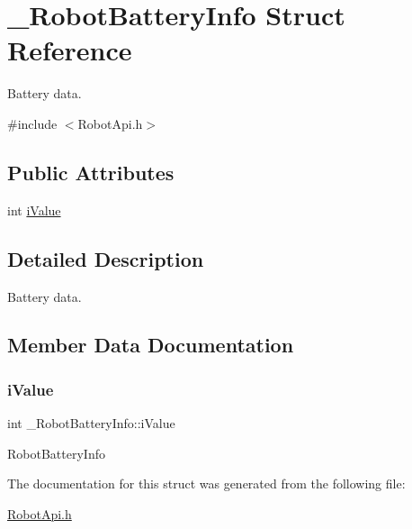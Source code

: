 \hypertarget{struct__RobotBatteryInfo}{}\section{\+\_\+\+Robot\+Battery\+Info Struct Reference}
\label{struct__RobotBatteryInfo}


Battery data.  




{\ttfamily \#include $<$Robot\+Api.\+h$>$}

\subsection*{Public Attributes}
\begin{DoxyCompactItemize}
\item 
int \hyperlink{struct__RobotBatteryInfo_a7b54314dbf8b141f72d38bcdf1ae3bca}{i\+Value}
\end{DoxyCompactItemize}


\subsection{Detailed Description}
Battery data. 

\subsection{Member Data Documentation}
\mbox{\label{struct__RobotBatteryInfo_a7b54314dbf8b141f72d38bcdf1ae3bca}} 
\subsubsection{\texorpdfstring{i\+Value}{iValue}}
{\footnotesize\ttfamily int \+\_\+\+Robot\+Battery\+Info\+::i\+Value}

Robot\+Battery\+Info 

The documentation for this struct was generated from the following file\+:\begin{DoxyCompactItemize}
\item 
\hyperlink{RobotApi_8h}{Robot\+Api.\+h}\end{DoxyCompactItemize}
